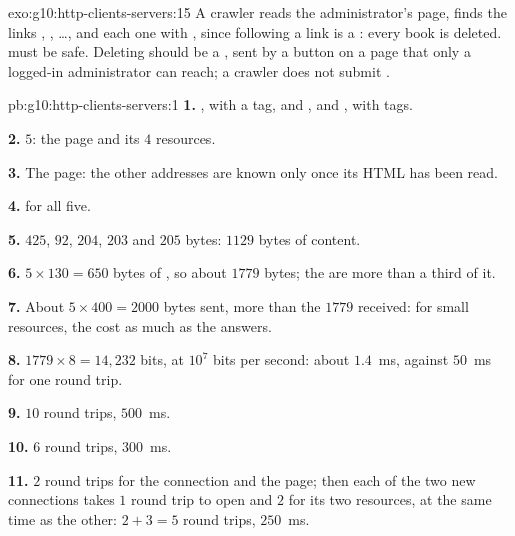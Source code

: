 \begin{solution}{exo:g10:http-clients-servers:15}
A crawler reads the administrator's page, finds the links , , \dots, and
 each one with , since following a link is a : every book is deleted.  must be safe. Deleting
should be a , sent by a  button on a page that only a logged-in administrator can reach; a crawler does not
submit .
\end{solution}

\begin{solution}{pb:g10:http-clients-servers:1}
\textbf{1.} , with a  tag, and ,  and , with
 tags.

\textbf{2.} $5$: the page and its $4$ resources.

\textbf{3.} The page: the other addresses are known only once its HTML has been read.

\textbf{4.}  for all five.

\textbf{5.} $425$, $92$, $204$, $203$ and $205$ bytes: $1129$ bytes of content.

\textbf{6.} $5 \times 130 = 650$ bytes of , so about $1779$ bytes; the  are more than a third of it.

\textbf{7.} About $5 \times 400 = 2000$ bytes sent, more than the $1779$ received: for small resources, the 
cost as much as the answers.

\textbf{8.} $1779 \times 8 = 14{,}232$ bits, at $10^7$ bits per second: about $1.4$~ms, against $50$~ms for one round
trip.

\textbf{9.} $10$ round trips, $500$~ms.

\textbf{10.} $6$ round trips, $300$~ms.

\textbf{11.} $2$ round trips for the connection and the page; then each of the two new connections takes $1$ round
trip to open and $2$ for its two resources, at the same time as the other: $2 + 3 = 5$ round trips, $250$~ms.


\end{solution}
